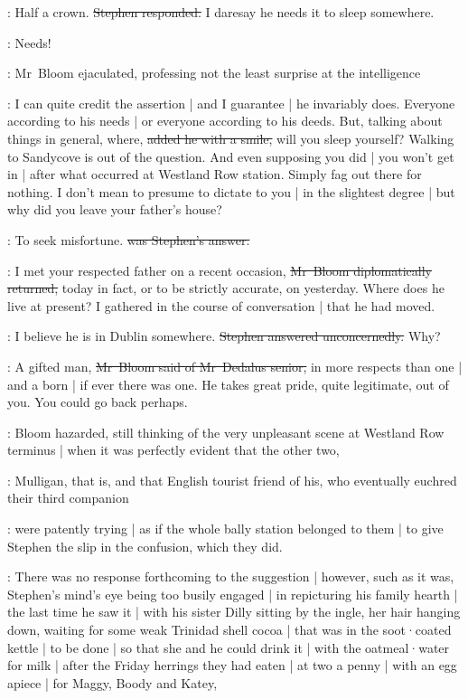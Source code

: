 \Stephen:
Half a crown.
\sout{Stephen responded.}
I daresay he needs it to sleep somewhere.

\Bloom:
Needs!

:
Mr~Bloom ejaculated,
professing not the least surprise at the intelligence

\Bloom:
I can quite credit the assertion |
and I guarantee |
he invariably does.
Everyone according to his needs |
or everyone according to his deeds.
But,
talking about things in general,
where,
\sout{added he with a smile,}
will you sleep yourself?
Walking to Sandycove is out of the question.
And even supposing you did |
you won't get in |
after what occurred at Westland Row station.
Simply fag out there for nothing.
I don't mean to presume to dictate to you |
in the slightest degree |
but why did you leave your father's house?

\Stephen:
To seek misfortune.
\sout{was Stephen's answer.}

\Bloom:
I met your respected father on a recent occasion,
\sout{Mr~Bloom diplomatically returned,}
today in fact,
or to be strictly accurate,
on yesterday.
Where does he live at present?
I gathered in the course of conversation |
that he had moved.

\Stephen:
I believe he is in Dublin somewhere.
\sout{Stephen answered unconcernedly.}
Why?

\Bloom:
A gifted man,
\sout{Mr~Bloom said of Mr~Dedalus senior,}
in more respects than one |
and a born  |
if ever there was one.
He takes great pride,
quite legitimate,
out of you.
You could go back perhaps.

:
Bloom hazarded,
still thinking of the very unpleasant scene at Westland Row terminus |
when it was perfectly evident that the other two,

:
Mulligan,
that is,
and that English tourist friend of his,
who eventually euchred their third companion

:
were patently trying |
as if the whole bally station belonged to them |
to give Stephen the slip in the confusion,
which they did.

:
There was no response forthcoming to the suggestion |
however,
such as it was,
Stephen's mind's eye being too busily engaged |
in repicturing his family hearth |
the last time he saw it |
with his sister Dilly sitting by the ingle,
her hair hanging down,
waiting for some weak Trinidad shell cocoa |
that was in the soot·coated kettle |
to be done |
so that she and he could drink it |
with the oatmeal·water for milk |
after the Friday herrings they had eaten |
at two a penny |
with an egg apiece |
for Maggy,
Boody
and Katey,

